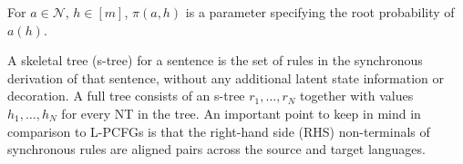 \documentclass[11pt]{article}
\newcommand{\rules}{{\cal R}}
\newcommand{\bS}{{\bf S}}
\newcommand{\bX}{{\bf X}}
\newenvironment{itemizesquish}{\begin{list}{\setcounter{enumi}{0}\labelitemi}{\setlength{\itemsep}{-0.25em}\setlength{\labelwidth}{0.5em}\setlength{\leftmargin}{\labelwidth}\addtolength{\leftmargin}{\labelsep}}}{\end{list}}
\newcommand{\cjd}[1]{\textcolor{red}{\textbf{[#1 --CJD] }}}
\newcommand{\ignore}[1]{}
\begin{document}
\begin{itemizesquish}
\ignore{
For $a =\bX, b \in [n_s] \cup \mathcal{N} \setminus \{\bS\}, c \in [n_t]
     \cup \mathcal{N} \setminus \{\bS\}, h_1, h_2, h_3 \in [m]$, we have the following context-free rules, based on the number of NT symbols \bX~in the RHS of the rule:
     \begin{itemize}
       \item Two NTs: \\
	   $a(h_1) \rightarrow ~ \langle b(h_2, h_3), c(h_2, h_3), \sim \rangle$, where $\sim$ is a one-to-one correspondence between the NT symbols of $b$ and $c$, $h_2$ is associated with one of the aligned NT pairs, and $h_3$ is associated with the other pair.  
	   The rule has an associated parameter $t(a \rightarrow b,c, h_2, h_3 | a, h_1)$
       \item One NT: \\
	   	$a(h_1) \rightarrow ~\langle b(h_2), c(h_2), \sim \rangle$, with associated parameter $t(a \rightarrow b, c, h_2 | a, h_1)$
       \item No NTs:
	   	$a(h_1) \rightarrow ~ \langle b, c,\sim \rangle$, with associated parameter $t(a \rightarrow b,c | a, h_1)$
        \end{itemize}
}
         \item For $a \in \mathcal{N}$, $h \in [m]$, $\pi(a, h)$ is a parameter specifying the root probability of $a(h)$. 
\end{itemizesquish}
A skeletal tree (s-tree) for a sentence is the set of rules in the synchronous derivation of that sentence, without any additional latent state information or decoration.  
A full tree consists of an s-tree $r_1, \dots, r_N$ together with values $h_1, \dots, h_N$ for every NT in the tree.  
An important point to keep in mind in comparison to L-PCFGs is that the right-hand side (RHS) non-terminals of synchronous rules are aligned pairs across the source and target languages.  
\end{document}
